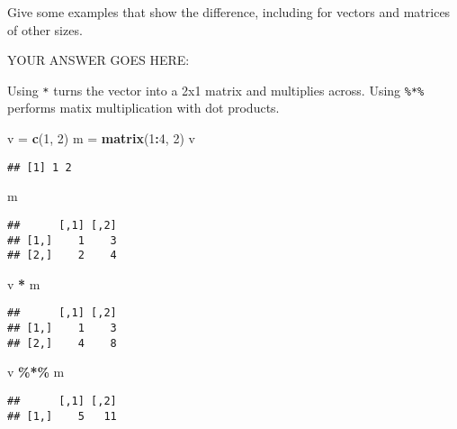 \documentclass[
]{article}
\newenvironment{Shaded}{\begin{snugshade}}{\end{snugshade}}
\newcommand{\DecValTok}[1]{\textcolor[rgb]{0.00,0.00,0.81}{#1}}
\newcommand{\KeywordTok}[1]{\textcolor[rgb]{0.13,0.29,0.53}{\textbf{#1}}}
\newcommand{\NormalTok}[1]{#1}
\newcommand{\OperatorTok}[1]{\textcolor[rgb]{0.81,0.36,0.00}{\textbf{#1}}}
\newcommand{\StringTok}[1]{\textcolor[rgb]{0.31,0.60,0.02}{#1}}
\begin{document}
Give some examples that show the difference, including for vectors and
matrices of other sizes.

YOUR ANSWER GOES HERE:

Using \texttt{*} turns the vector into a 2x1 matrix and multiplies
across. Using \texttt{\%*\%} performs matix multiplication with dot
products.

\begin{Shaded}
\begin{Highlighting}[]
\NormalTok{v =}\StringTok{ }\KeywordTok{c}\NormalTok{(}\DecValTok{1}\NormalTok{, }\DecValTok{2}\NormalTok{)}
\NormalTok{m =}\StringTok{ }\KeywordTok{matrix}\NormalTok{(}\DecValTok{1}\OperatorTok{:}\DecValTok{4}\NormalTok{, }\DecValTok{2}\NormalTok{)}
\NormalTok{v}
\end{Highlighting}
\end{Shaded}

\begin{verbatim}
## [1] 1 2
\end{verbatim}

\begin{Shaded}
\begin{Highlighting}[]
\NormalTok{m}
\end{Highlighting}
\end{Shaded}

\begin{verbatim}
##      [,1] [,2]
## [1,]    1    3
## [2,]    2    4
\end{verbatim}

\begin{Shaded}
\begin{Highlighting}[]
\NormalTok{v }\OperatorTok{*}\StringTok{ }\NormalTok{m}
\end{Highlighting}
\end{Shaded}

\begin{verbatim}
##      [,1] [,2]
## [1,]    1    3
## [2,]    4    8
\end{verbatim}

\begin{Shaded}
\begin{Highlighting}[]
\NormalTok{v }\OperatorTok{\%*\%}\StringTok{ }\NormalTok{m}
\end{Highlighting}
\end{Shaded}

\begin{verbatim}
##      [,1] [,2]
## [1,]    5   11
\end{verbatim}
\end{document}
